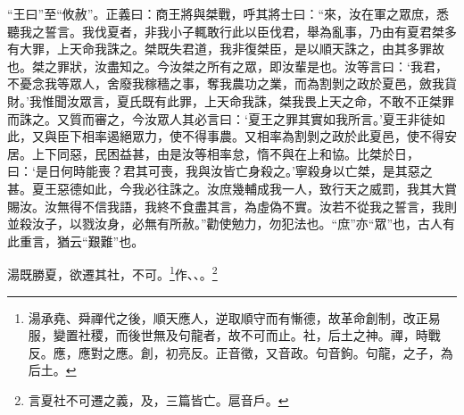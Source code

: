 {\noindent\shu{}\fzkt “王曰”至“攸赦”。正義曰：商王將與桀戰，呼其將士曰：“來，汝在軍之眾庶，悉聽我之誓言。我伐夏者，非我小子輒敢行此以臣伐君，舉為亂事，乃由有夏君桀多有大罪，上天命我誅之。桀既失君道，我非復桀臣，是以順天誅之，由其多罪故也。桀之罪狀，汝盡知之。今汝桀之所有之眾，即汝輩是也。汝等言曰：‘我君，不憂念我等眾人，舍廢我稼穡之事，奪我農功之業，而為割剝之政於夏邑，斂我貨財。’我惟聞汝眾言，夏氏既有此罪，上天命我誅，桀我畏上天之命，不敢不正桀罪而誅之。又質而審之，今汝眾人其必言曰：‘夏王之罪其實如我所言。’夏王非徒如此，又與臣下相率遏絕眾力，使不得事農。又相率為割剝之政於此夏邑，使不得安居。上下同惡，民困益甚，由是汝等相率怠，惰不與在上和協。比桀於日，曰：‘是日何時能喪？君其可喪，我與汝皆亡身殺之。’寧殺身以亡桀，是其惡之甚。夏王惡德如此，今我必往誅之。汝庶幾輔成我一人，致行天之威罰，我其大賞賜汝。汝無得不信我語，我終不食盡其言，為虛偽不實。汝若不從我之誓言，我則並殺汝子，以戮汝身，必無有所赦。”勸使勉力，勿犯法也。“庶”亦“眾”也，古人有此重言，猶云“艱難”也。 \par}

湯既勝夏，欲遷其社，不可。\footnote{湯承堯、舜禪代之後，順天應人，逆取順守而有慚德，故革命創制，改正易服，變置社稷，而後世無及句龍者，故不可而止。社，后土之神。禪，時戰反。應，應對之應。創，初亮反。正音徵，又音政。句音鉤。句龍，之子，為后土。}作、、。\footnote{言夏社不可遷之義，及，三篇皆亡。扈音戶。}

